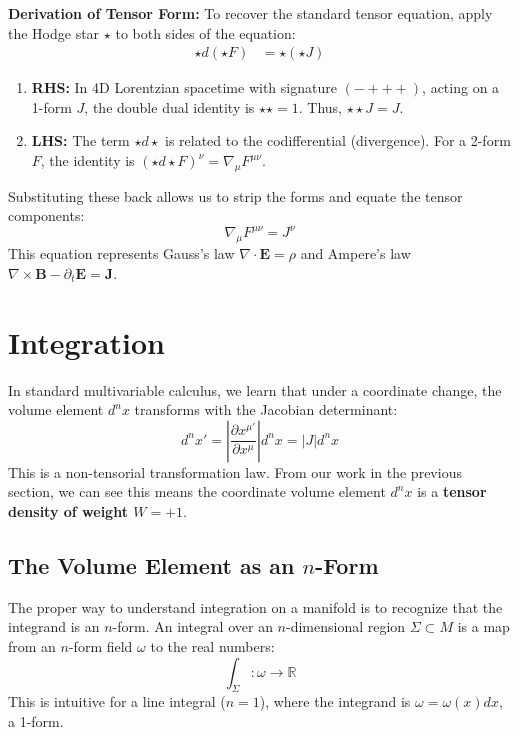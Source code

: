\documentclass[11pt, a4paper]{report}
\begin{document}
\begin{itemize}
    \textbf{Derivation of Tensor Form:}
    To recover the standard tensor equation, apply the Hodge star $\star$ to both sides of the equation:
    \begin{align*}
        \star d (\star F) &= \star (\star J)
    \end{align*}
    \begin{enumerate}
        \item \textbf{RHS:} In 4D Lorentzian spacetime with signature $(-+++)$, acting on a 1-form $J$, the double dual identity is $\star \star = 1$. Thus, $\star \star J = J$.
        \item \textbf{LHS:} The term $\star d \star$ is related to the codifferential (divergence). For a 2-form $F$, the identity is $(\star d \star F)^\nu = \nabla_\mu F^{\mu\nu}$.
    \end{enumerate}
    Substituting these back allows us to strip the forms and equate the tensor components:
    \begin{equation}
        \nabla_\mu F^{\mu\nu} = J^\nu
    \end{equation}
    This equation represents Gauss's law $\nabla \cdot \mathbf{E} = \rho$ and Ampere's law $\nabla \times \mathbf{B} - \partial_t \mathbf{E} = \mathbf{J}$.
\end{itemize}
\section{Integration}

In standard multivariable calculus, we learn that under a coordinate change, the volume element $d^n x$ transforms with the Jacobian determinant:
\begin{equation}
    d^n x' = \left| \frac{\partial x^{\mu'}}{\partial x^\mu} \right| d^n x = |J| d^n x
\end{equation}
This is a non-tensorial transformation law. From our work in the previous section, we can see this means the coordinate volume element $d^n x$ is a \textbf{tensor density of weight $W=+1$}.

\subsection*{The Volume Element as an $n$-Form}
The proper way to understand integration on a manifold is to recognize that the integrand is an $n$-form. An integral over an $n$-dimensional region $\Sigma \subset M$ is a map from an $n$-form field $\omega$ to the real numbers:
\begin{equation}
    \int_\Sigma : \omega \to \mathbb{R}
\end{equation}
This is intuitive for a line integral ($n=1$), where the integrand is $\omega = \omega(x) dx$, a 1-form.
\end{document}
